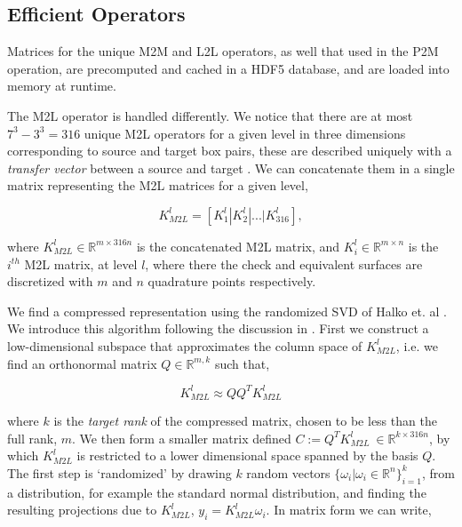 \documentclass{IEEEcsmag}
\begin{document}
\subsection{Efficient Operators}

Matrices for the unique M2M and L2L operators, as well that used in the P2M operation, are precomputed and cached in a HDF5 database, and are loaded into memory at runtime.

The M2L operator is handled differently. We notice that there are at most $7^3-3^3=316$ unique M2L operators for a given level in three dimensions corresponding to source and target box pairs, these are described uniquely with a \textit{transfer vector} between a source and target \cite{Fong2009}. We can concatenate them in a single matrix representing the M2L matrices for a given level,

\begin{equation}
    K_{M2L}^{l} = \left [ K^l_1 | K^l_2 | ... | K^l_{316} \right],
    \label{eq:2_4_concatenated_m2l}
\end{equation}

where $K_{M2L}^l \in \mathbb{R}^{m \times 316n}$ is the concatenated M2L matrix, and $K_i^l \in \mathbb{R}^{m \times n}$ is the $i^{th}$ M2L matrix, at level $l$, where there the check and equivalent surfaces are discretized with $m$ and $n$ quadrature points respectively.

We find a compressed representation using the randomized SVD of Halko et. al \cite{Halko2011}. We introduce this algorithm following the discussion in \cite{Erichson}. First we construct a low-dimensional subspace that approximates the column space of $K_{M2L}^l$, i.e. we
find an orthonormal matrix $Q \in \mathbb{R}^{m, k}$ such that,

\begin{equation}
    K_{M2L}^l \approx QQ^TK_{M2L}^l
    \label{eq:2_4_step_1_randomised}
\end{equation}

where $k$ is the \textit{target rank} of the compressed matrix, chosen to be less than the full rank, $m$. We then form a smaller matrix defined $C := Q^TK_{M2L}^l \> \in \mathbb{R}^{k \times 316n}$, by which $K_{M2L}^l$ is restricted to a lower dimensional space spanned by the basis $Q$. The first step is `randomized' by drawing $k$ random vectors $\{ \omega_i | \omega_i \in \mathbb{R}^n \}_{i=1}^k$, from a distribution, for example the standard normal distribution, and finding the resulting projections due to $K_{M2L}^l$, $y_i = K_{M2L}^l \omega_i$. In matrix form we can write,
\end{document}
